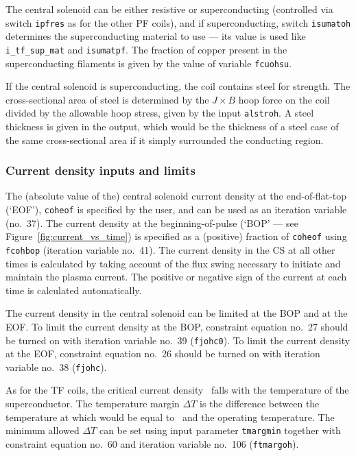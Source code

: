 \documentclass[11pt,a4paper]{report}
\begin{document}
The central solenoid can be either resistive or superconducting (controlled
via switch \texttt{ipfres} as for the other PF coils), and if superconducting,
switch \texttt{isumatoh} determines the superconducting material to use ---
its value is used like \texttt{i\_tf\_sup\_mat} and \texttt{isumatpf}. The fraction
of copper present in the superconducting filaments is given by the value of
variable \texttt{fcuohsu}.

If the central solenoid is superconducting, the coil contains steel for
strength. The cross-sectional area of steel is determined by the $J \times B$
hoop force on the coil divided by the allowable hoop stress, given by the input \texttt{alstroh}. A steel
thickness is given in the output, which would be the thickness of a
steel case of the same cross-sectional area if it simply surrounded the
conducting region.

\subsubsection{Current density inputs and limits}

The (absolute value of the) central solenoid current density at the
end-of-flat-top (`EOF'), \texttt{coheof} is specified by the user, and can be
used as an iteration variable (no.\ 37). The current density at the
beginning-of-pulse (`BOP' --- see Figure~\ref{fig:current_vs_time}) is
specified as a (positive) fraction of \texttt{coheof} using \texttt{fcohbop}
(iteration variable no.\ 41). The current density in the CS at all other times
is calculated by taking account of the flux swing necessary to initiate and
maintain the plasma current. The positive or negative sign of the current at
each time is calculated automatically.

The current density in the central solenoid can be limited at the BOP and at
the EOF. To limit the current density at the BOP, constraint equation no.\ 27
should be turned on with iteration variable no.\ 39 (\texttt{fjohc0}). To
limit the current density at the EOF, constraint equation no.\ 26 should be
turned on with iteration variable no.\ 38 (\texttt{fjohc}).

As for the TF coils, the critical current density \jcrit\ falls with the
temperature of the superconductor. The temperature margin $\Delta T$ is the
difference between the temperature at which \jcrit would be equal to \jop\ and
the operating temperature. The minimum allowed $\Delta T$ can be set using
input parameter \texttt{tmargmin} together with constraint equation no.\ 60
and iteration variable no.\ 106 (\texttt{ftmargoh}).
\end{document}
